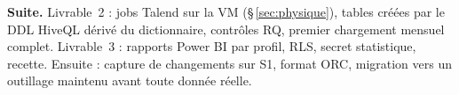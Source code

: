 \textbf{Suite.} Livrable~2 : jobs Talend sur la VM (§\,\ref{sec:physique}), tables créées par le DDL HiveQL dérivé du dictionnaire, contrôles RQ, premier chargement mensuel complet. Livrable~3 : rapports Power BI par profil, RLS, secret statistique, recette. Ensuite : capture de changements sur S1, format ORC, migration vers un outillage maintenu avant toute donnée réelle.\label{tab:roadmap}

